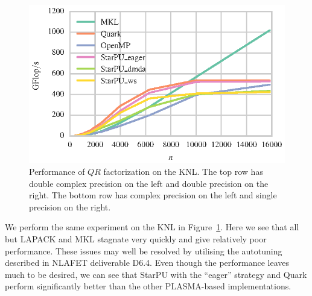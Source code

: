 \documentclass[a4paper,12pt]{article}
\begin{document}
\begin{figure}[t]
  \includegraphics[scale=.85]{fig/knl_ram_sgeqrf_weak_scaling.eps}
  \caption{Performance of $QR$ factorization on the KNL.
    The top row has double complex precision on the left and double
    precision on the right.
    The bottom row has complex precision on the left and single
    precision on the right.}
  \label{fig.qr_knl_ram}
\end{figure}

We perform the same experiment on the KNL in
Figure~\ref{fig.qr_knl_ram}.
Here we see that all but LAPACK and MKL stagnate very quickly
and give relatively poor performance.
These issues may well be resolved by utilising the
autotuning described in NLAFET deliverable D6.4.
Even though the performance leaves much to be desired,
we can see that StarPU with the ``eager'' strategy
and Quark perform significantly better than the
other PLASMA-based implementations.

\end{document}

